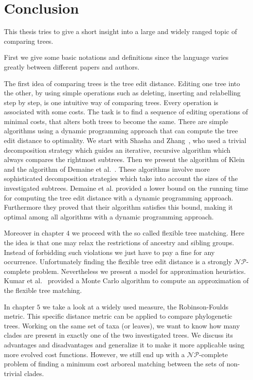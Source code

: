 \chapter{Conclusion}
This thesis tries to give a short insight into a large and widely ranged topic of comparing trees. 

First we give some basic notations and definitions since the language varies greatly between different papers and authors. 

The first idea of comparing trees is the tree edit distance. Editing one tree into the other, by using simple operations such as deleting, inserting and relabelling step by step, is one intuitive way of comparing trees. Every operation is associated with some costs. The task is to find a sequence of editing operations of minimal costs, that alters both trees to become the same. There are simple algorithms using a dynamic programming approach that can compute the tree edit distance to optimality. We start with Shasha and Zhang~\cite{SasAndZha}, who used a trivial decomposition strategy which guides an iterative, recursive algorithm which always compares the rightmost subtrees. Then we present the algorithm of Klein~\cite{Kle} and the algorithm of Demaine et al.~\cite{Dem}. These algorithms involve more sophisticated decomposition strategies which take into account the sizes of the investigated subtrees. Demaine et al. provided a lower bound on the running time for computing the tree edit distance with a dynamic programming approach. Furthermore they proved that their algorithm satisfies this bound, making it optimal among all algorithms with a dynamic programming approach. 

Moreover in chapter $4$ we proceed with the so called flexible tree matching. Here the idea is that one may relax the restrictions of ancestry and sibling groups. Instead of forbidding such violations we just have to pay a fine for any occurrence. Unfortunately finding the flexible tree edit distance is a strongly $\mathcal{NP}$-complete problem. Nevertheless we present a model for approximation heuristics. Kumar et al.~\cite{Kum} provided a Monte Carlo algorithm to compute an approximation of the flexible tree matching.

In chapter $5$ we take a look at a widely used measure, the Robinson-Foulds metric. This specific distance metric can be applied to compare phylogenetic trees. Working on the same set of taxa (or leaves), we want to know how many clades are present in exactly one of the two investigated trees. We discuss its advantages and disadvantages and generalize it to make it more applicable using more evolved cost functions. However, we still end up with a $\mathcal{NP}$-complete problem of finding a minimum cost arboreal matching between the sets of non-trivial clades.

